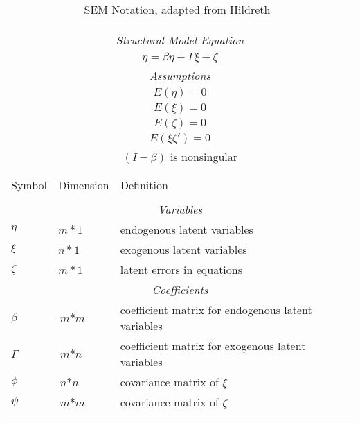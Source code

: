\begin{table}
	\begin{center}	
		\caption{SEM Notation, adapted from Hildreth~\cite{hildreth2013residual}}
		\label{tab:background_sem_bollen_equations}
		\begin{normalsize}
			\begin{tabular}{lll}
				&&\\
				[-1.8ex]\hline 
				\hline &&\\[-1.8ex] 
				\multicolumn{3}{c}{\textit{Structural Model Equation}}\\
				\multicolumn{3}{c}{$\eta = \beta\eta + \Gamma\xi + \zeta$}\\
				\multicolumn{3}{c}{\textit{Assumptions}}\\
				\multicolumn{3}{c}{$\textit{E}(\eta) = 0$}\\
				\multicolumn{3}{c}{$\textit{E}(\xi) = 0$}\\
				\multicolumn{3}{c}{$\textit{E}(\zeta) = 0$}\\
				\multicolumn{3}{c}{$\textit{E}(\xi\zeta') = 0$}\\
				\multicolumn{3}{c}{$(I - \beta)$ is nonsingular}\\
				
				&&\\
				[-1.8ex]\hline 
				\hline &&\\[-1.8ex] 
				Symbol & Dimension & Definition \\
				\hline &&\\[-1.8ex] 				
				\multicolumn{3}{c}{\textit{Variables}}\\
				 $\eta$ & $\textit{m} * 1$ & endogenous latent variables  \\
				 $\xi$ & $\textit{n} * 1$ & exogenous latent variables  \\
				 $\zeta$ & $\textit{m} * 1$ & latent errors in equations  \\
				\multicolumn{3}{c}{\textit{Coefficients}}\\
				 $\beta$ & $\textit{m} * \textit{m}$ & coefficient matrix for endogenous latent variables\\
				 $\Gamma$ & $\textit{m} * \textit{n}$ & coefficient matrix for exogenous latent variables\\	
				 
				 $\phi$ & $\textit{n} * \textit{n}$ & covariance matrix of $\xi$\\	
				 $\psi$ & $\textit{m} * \textit{m}$ & covariance matrix of $\zeta$\\	
				 				 			 
				\hline &&\\[-1.8ex] 				
			\end{tabular}
		\end{normalsize}
	\end{center}
\end{table}

